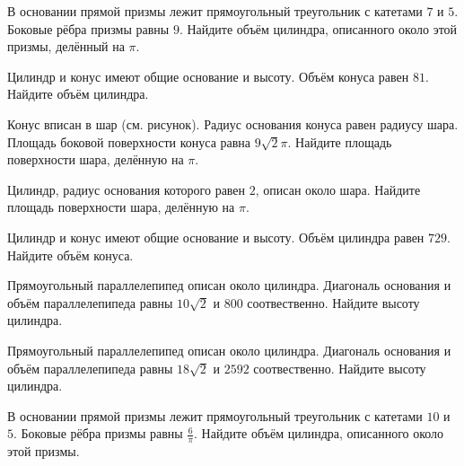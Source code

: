\documentclass[4apaper]{article}
\begin{document}
\begin{taskBN}{89}
В основании прямой призмы лежит прямоугольный треугольник с катетами $7$ и $5$. Боковые рёбра призмы равны $9$. Найдите объём цилиндра, описанного около этой призмы, делённый на $\pi$.
\end{taskBN}

\begin{taskBN}{90}
Цилиндр и конус имеют общие основание и высоту. Объём конуса равен $81$. Найдите объём цилиндра.
\end{taskBN}

\begin{taskBN}{91}
Конус вписан в шар (см. рисунок).  Радиус основания конуса равен радиусу шара. Площадь боковой поверхности конуса равна $9\sqrt{2}\pi$. Найдите площадь поверхности шара, делённую на $\pi$.
\end{taskBN}

\begin{taskBN}{92}
 Цилиндр, радиус основания которого равен $2$, описан около шара. Найдите площадь поверхности шара, делённую на $\pi$.
\end{taskBN}

\begin{taskBN}{93}
Цилиндр и конус имеют общие основание и высоту. Объём цилиндра равен $729$. Найдите объём конуса.
\end{taskBN}

\begin{taskBN}{94}
Прямоугольный параллелепипед описан около цилиндра. Диагональ основания и объём параллелепипеда равны $10\sqrt{2}$ и $800$ соотвественно. Найдите высоту цилиндра.
\end{taskBN}

\begin{taskBN}{95}
Прямоугольный параллелепипед описан около цилиндра. Диагональ основания и объём параллелепипеда равны $18\sqrt{2}$ и $2592$ соотвественно. Найдите высоту цилиндра.
\end{taskBN}

\begin{taskBN}{96}
В основании прямой призмы лежит прямоугольный треугольник с катетами $10$ и $5$. Боковые рёбра призмы равны $\frac{6}{\pi}$. Найдите объём цилиндра, описанного около этой призмы.
\end{taskBN}
\end{document}
